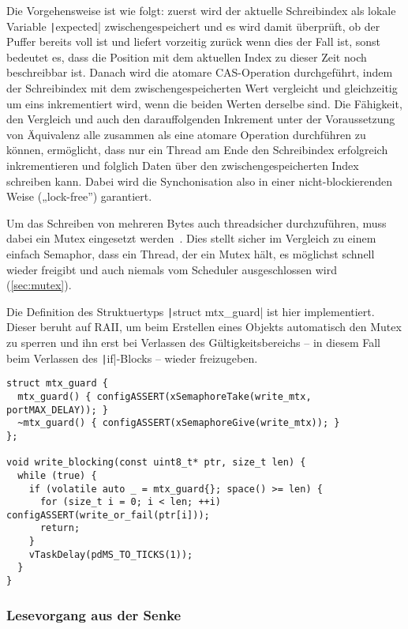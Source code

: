 Die Vorgehensweise ist wie folgt: zuerst wird der aktuelle Schreibindex als
lokale Variable \texttt|expected| zwischengespeichert und es wird damit
überprüft, ob der Puffer bereits voll ist und liefert vorzeitig zurück wenn dies
der Fall ist, sonst bedeutet es, dass die Position mit dem aktuellen Index zu
dieser Zeit noch beschreibbar ist. Danach wird die atomare CAS-Operation
durchgeführt, indem der Schreibindex mit dem zwischengespeicherten Wert
vergleicht und gleichzeitig um eins inkrementiert wird, wenn die beiden Werten
derselbe sind. Die Fähigkeit, den Vergleich und auch den darauffolgenden
Inkrement unter der Voraussetzung von Äquivalenz alle zusammen als eine atomare
Operation durchführen zu können, ermöglicht, dass nur ein Thread am Ende den
Schreibindex erfolgreich inkrementieren und folglich Daten über den
zwischengespeicherten Index schreiben kann. Dabei wird die Synchonisation also
in einer nicht-blockierenden Weise („lock-free”) garantiert.

Um das Schreiben von mehreren Bytes auch threadsicher durchzuführen, muss dabei
ein Mutex eingesetzt werden~\cite{FreeRTOSForumPrintf}. Dies stellt sicher im
Vergleich zu einem einfach Semaphor, dass ein Thread, der ein Mutex hält, es
möglichst schnell wieder freigibt und auch niemals vom Scheduler ausgeschlossen
wird (\ref{sec:mutex}).

Die Definition des Struktuertyps \texttt|struct mtx_guard| ist hier
implementiert. Dieser beruht auf \ac{RAII}, um beim Erstellen eines Objekts
automatisch den Mutex zu sperren und ihn erst bei Verlassen des
Gültigkeitsbereichs – in diesem Fall beim Verlassen des
\texttt|if|-Blocks – wieder freizugeben.

\begin{code}
\begin{verbatim}
struct mtx_guard {
  mtx_guard() { configASSERT(xSemaphoreTake(write_mtx, portMAX_DELAY)); }
  ~mtx_guard() { configASSERT(xSemaphoreGive(write_mtx)); }
};

void write_blocking(const uint8_t* ptr, size_t len) {
  while (true) {
    if (volatile auto _ = mtx_guard{}; space() >= len) {
      for (size_t i = 0; i < len; ++i) configASSERT(write_or_fail(ptr[i]));
      return;
    }
    vTaskDelay(pdMS_TO_TICKS(1));
  }
}
\end{verbatim}
\end{code}

\subsubsection{Lesevorgang aus der Senke}

